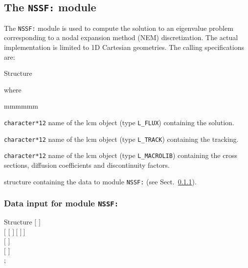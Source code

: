 \subsection{The {\tt NSSF:} module}

The {\tt NSSF:} module is used to compute the solution to an eigenvalue problem corresponding to a nodal expansion method (NEM) discretization. The actual implementation is limited to
1D Cartesian geometries. The calling specifications are:

\begin{DataStructure}{Structure }
 \moc{:=}    \moc{::} 
\end{DataStructure}

\noindent where
\begin{ListeDeDescription}{mmmmmm}

\item[\dusa{FLUX}] {\tt character*12} name of the {\sc lcm} object (type {\tt L\_FLUX}) containing the solution.

\item[\dusa{TRACK}] {\tt character*12} name of the {\sc lcm} object (type {\tt L\_TRACK}) containing the {\sc tracking}.

\item[\dusa{MACRO}] {\tt character*12} name of the {\sc lcm} object (type {\tt L\_MACROLIB}) containing the cross sections, diffusion coefficients and discontinuity
factors.

\item[\dstr{NSSF\_data}] structure containing the data to module {\tt NSSF:} (see Sect.~\ref{sect:fld_data}).

\end{ListeDeDescription}

\vskip 0.2cm

\subsubsection{Data input for module {\tt NSSF:}}\label{sect:fld_data}

\begin{DataStructure}{Structure }
$[$   $]$ \\
$[$   $[$  $]~[$  $]~]$ \\
$[$  $]$ \\
$[$   $]$  \\
;
\end{DataStructure}

